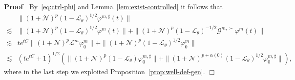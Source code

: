 \documentclass[10pt]{article}
\newcommand{\tmcolor}[2]{{\color{#1}{#2}}}
\newenvironment{proof}{\noindent\textbf{Proof\ }}{\hspace*{\fill}$\Box$\medskip}
\begin{document}
\begin{proof}
  \tmcolor{red}{}By~{\eqref{eq:ctrl-phi}} and Lemma~\ref{lem:exist-controlled}
  it follows that
  \[ \begin{array}{ll}
       & \| (1 +\mathcal{N})^p (1 -\mathcal{L}_{\theta})^{1 / 2} \varphi^{m,
       \sharp} (t) \|\\
       \lesssim & \| (1 +\mathcal{N})^p (1 -\mathcal{L}_{\theta})^{1 / 2}
       \varphi^m (t) \| + \| (1 +\mathcal{N})^p (1 -\mathcal{L}_{\theta})^{- 1
       / 2} \mathcal{G}^{m, \succ} \varphi^m (t) \|\\
       \lesssim & t e^{t C} \| (1 +\mathcal{N})^p \mathcal{L}^m \varphi^m_0 \|
       + \| (1 +\mathcal{N})^p (1 -\mathcal{L}_{\theta})^{1 / 2} \varphi^m_0
       \|\\
       \lesssim & (t e^{t C} + 1)^{1 / 2} (\| (1 +\mathcal{N})^p (1
       -\mathcal{L}_{\theta}) \varphi_0^{m, \sharp} \| + \| (1
       +\mathcal{N})^{p + \alpha (0)} (1 -\mathcal{L}_{\theta})^{1 / 2}
       \varphi_0^{m, \sharp} \|),
     \end{array} \]
  where in the last step we exploited Proposition~\ref{prop:well-def-gen}.
\end{proof}
\end{document}
